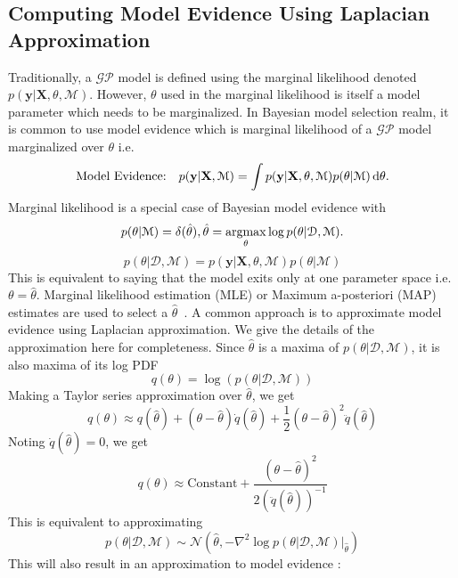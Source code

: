 \subsection{Computing Model Evidence Using Laplacian Approximation}
Traditionally, a $\mathcal{GP}$ model is defined using the marginal likelihood denoted \(p(\textbf{y}|\textbf{X},\theta,\mathcal{M})\). However, $\theta$ used in the marginal likelihood is itself a model parameter which needs to be marginalized. In Bayesian model selection realm, it is common to use model evidence which is marginal likelihood of a $\mathcal{GP}$ model marginalized over $\theta$ i.e. \[\text{Model Evidence:} \quad p(\textbf{y}|\textbf{X},\mathcal{M})=\int p(\textbf{y}|\textbf{X},\theta,\mathcal{M})p(\theta|\mathcal{M}) \mathop{}\!\mathrm{d}{\theta}.\] 
Marginal likelihood is a special case of Bayesian model evidence with \[p(\theta|\mathcal{M})=\delta(\hat{\theta}), \hat{\theta}=\operatorname*{argmax}_{\theta} \log p(\theta|\mathcal{D},\mathcal{M}). \] \[p(\theta|\mathcal{D},\mathcal{M})=p(\textbf{y}|\textbf{X},\theta,\mathcal{M})p(\theta|\mathcal{M})\]
This is equivalent to saying that the model exits only at one parameter space i.e. \(\theta=\hat{\theta}\). Marginal likelihood estimation (MLE) or Maximum a-posteriori (MAP) estimates are used to select a $\hat{\theta}$~\cite{gardner2015bayesian}.
A common approach is to approximate model evidence using Laplacian approximation. We give the details of the approximation here for completeness.
Since $\hat{\theta}$ is a maxima of \(p(\theta|\mathcal{D},\mathcal{M})\), it is also maxima of its log PDF \[q(\theta)=\log(p(\theta|\mathcal{D},\mathcal{M}))\]
Making a Taylor series approximation over $\hat{\theta}$, we get \[q(\theta)\approx q(\hat{\theta})+(\theta-\hat{\theta})\dot q(\hat{\theta})+\frac{1}{2}(\theta-\hat{\theta})^{2}\ddot q(\hat{\theta})\]
Noting \(\dot q(\hat{\theta})=0\), we get \[q(\theta)\approx \text{Constant} +\frac{(\theta-\hat{\theta})^{2}}{2 (\ddot q(\hat{\theta}))^{-1}} \] 
This is equivalent to approximating \[ p(\theta|\mathcal{D},\mathcal{M})\sim \mathcal{N}(\hat{\theta},-\nabla^{2} \log p(\theta|\mathcal{D},\mathcal{M})\vert_{\hat{\theta}})\]
This will also result in an approximation to model evidence : 
